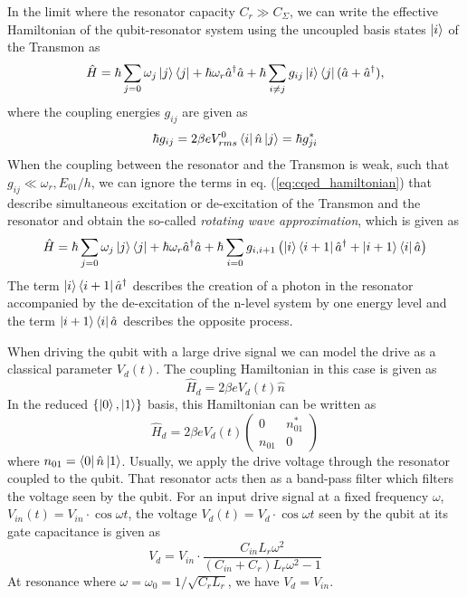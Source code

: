  In the limit where the resonator capacity $C_r \gg C_\Sigma$, we can write the effective Hamiltonian of the qubit-resonator system using the uncoupled basis states $\left| i \right>$ of the Transmon as
%
\begin{equation}
\hat{H} = \hbar \sum\limits_{j=0} \omega_j \left| j \right>\left< j \right| + \hbar \omega_r \hat{a}^\dagger \hat{a} + \hbar \sum\limits_{i\ne j} g_{ij} \left| i \right>\left< j \right|(\hat{a}+\hat{a}^\dagger), \label{eq:cqed_hamiltonian}
\end{equation}
%
where the coupling energies $g_{ij}$ are given as
%
\begin{equation}
\hbar g_{ij} = 2\beta e V_{rms}^0 \left< i \right|\hat{n}\left| j \right> = \hbar g_{ji}^*
\end{equation}
%
When the coupling between the resonator and the Transmon is weak, such that $g_{ij} \ll \omega_r,E_{01}/h$, we can ignore the terms in eq. (\ref{eq:cqed_hamiltonian}) that describe simultaneous excitation or de-excitation of the Transmon and the resonator and obtain the so-called {\it rotating wave approximation}, which is given as
%
\begin{equation}
\hat{H} = \hbar \sum\limits_{j=0} \omega_j \left| j \right>\left< j \right|+\hbar \omega_r \hat{a}^\dagger \hat{a} + \hbar \sum\limits_{i=0} g_{i,i+1}\left(\left| i \right>\left< i+1 \right|\hat{a}^\dagger +\left| i+1 \right>\left< i \right|\hat{a}\right) \label{eq:cqed_rotating_wave}
\end{equation}
%
The term $\left| i \right>\left< i+1 \right|\hat{a}^\dagger$ describes the creation of a photon in the resonator accompanied by the de-excitation of the n-level system by one energy level and the term $\left| i+1 \right>\left< i \right|\hat{a}$ describes the opposite process.

\smallskip

When driving the qubit with a large drive signal we can model the drive as a classical parameter $V_d(t)$. The coupling Hamiltonian in this case is given as
%
\begin{equation}
\hat{H}_d = 2\beta e V_d(t) \hat{n}
\end{equation}
%
In the reduced $\{\left| 0 \right>,\left| 1 \right>\}$ basis, this Hamiltonian can be written as
%
\begin{equation}
\hat{H}_d = 2\beta e V_d(t)\left(\begin{array}{cc} 0 & n_{01}^* \\ n_{01} & 0 \end{array}\right) \label{eq:drive_hamiltonian}
\end{equation}
%
where $n_{01} = \left< 0 \right|\hat{n}\left| 1 \right>$. Usually, we apply the drive voltage through the resonator coupled to the qubit. That resonator acts then as a band-pass filter which filters the voltage seen by the qubit. For an input drive signal at a fixed frequency $\omega$, $V_{in}(t)=V_{in}\cdot\cos{\omega t}$, the voltage $V_d(t)=V_{d}\cdot\cos{\omega t}$ seen by the qubit at its gate capacitance is given as
%
\begin{equation}
V_d = V_{in}\cdot\frac{C_{in}L_r \omega^2}{(C_{in}+C_r)L_r\omega^2-1} \label{eq:qubit_drive_voltage}
\end{equation}
%
At resonance where $\omega=\omega_0=1/\sqrt{C_r L_r}$, we have $V_d = V_{in}$.

